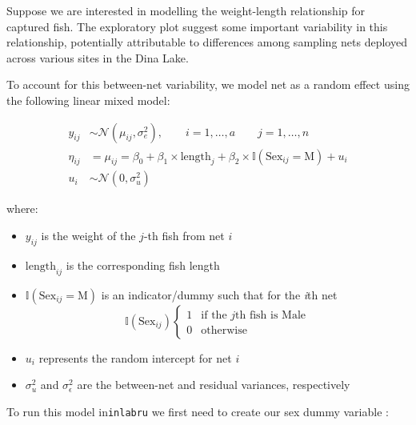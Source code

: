 \documentclass[
  letterpaper,
  DIV=11,
  numbers=noendperiod]{scrartcl}
\newenvironment{Shaded}{\begin{snugshade}}{\end{snugshade}}
\newcommand{\DecValTok}[1]{\textcolor[rgb]{0.68,0.00,0.00}{#1}}
\newcommand{\FunctionTok}[1]{\textcolor[rgb]{0.28,0.35,0.67}{#1}}
\newcommand{\NormalTok}[1]{\textcolor[rgb]{0.00,0.23,0.31}{#1}}
\newcommand{\OtherTok}[1]{\textcolor[rgb]{0.00,0.23,0.31}{#1}}
\newcommand{\SpecialCharTok}[1]{\textcolor[rgb]{0.37,0.37,0.37}{#1}}
\newcommand{\StringTok}[1]{\textcolor[rgb]{0.13,0.47,0.30}{#1}}
\begin{document}
Suppose we are interested in modelling the weight-length relationship
for captured fish. The exploratory plot suggest some important
variability in this relationship, potentially attributable to
differences among sampling nets deployed across various sites in the
Dina Lake.

To account for this between-net variability, we model net as a random
effect using the following linear mixed model:

\[
\begin{aligned}
y_{ij} &\sim\mathcal{N}(\mu_{ij}, \sigma_e^2), \qquad i = 1,\dots,a \qquad j = 1,\ldots,n \\
\eta_{ij} &= \mu_{ij} = \beta_0 + \beta_1 \times \text{length}_j + \beta_2 \times \mathbb{I}(\mathrm{Sex}_{ij}=\mathrm{M}) +  u_i \\
u_i &\sim \mathcal{N}(0,\sigma^2_u)
\end{aligned}
\]

where:

\begin{itemize}
\item
  \(y_{ij}\) is the weight of the \(j\)-th fish from net \(i\)
\item
  \(\text{length}_{ij}\) is the corresponding fish length
\item
  \(\mathbb{I}(\text{Sex}_{ij} = \text{M})\) is an indicator/dummy such
  that for the \emph{i}th net \[
  \mathbb{I}(\mathrm{Sex}_{ij}) \begin{cases}1 & \text{if the } j \text{th fish is Male} \\0 & \text{otherwise} \end{cases}
  \]
\item
  \(u_i\) represents the random intercept for net \(i\)
\item
  \(\sigma_u^2\) and \(\sigma_\epsilon^2\) are the between-net and
  residual variances, respectively
\end{itemize}

To run this model in\texttt{inlabru} we first need to create our sex
dummy variable :

\begin{Shaded}
\end{Shaded}
\end{document}
